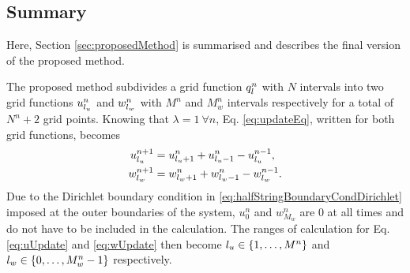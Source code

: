
% 

\subsection{Summary}
Here, Section \ref{sec:proposedMethod} is summarised and describes the final version of the proposed method.

The proposed method subdivides a grid function $q_l^n$ with $N$ intervals into two grid functions $u_{l_u}^n$ and $w_{l_w}^n$ with $M^n$ and $M_w^n$ intervals respectively for a total of $N^n+2$ grid points. Knowing that $\lambda=1 \ \forall n$, Eq. \eqref{eq:updateEq}, written for both grid functions, becomes 
\begin{subequations}\label{eq:uwUpdates}
    \begin{align}
        u_{l_u}^{n+1} &= u_{{l_u}+1}^n + u_{{l_u}-1}^n - u_{l_u}^{n-1},\label{eq:uUpdate}\\
        w_{l_w}^{n+1} &= w_{{l_w}+1}^n + w_{{l_w}-1}^n - w_{l_w}^{n-1}\label{eq:wUpdate}.
    \end{align}
\end{subequations}
%
Due to the Dirichlet boundary condition in \eqref{eq:halfStringBoundaryCondDirichlet} imposed at the outer boundaries of the system, $u_0^n$ and $w_{M_w}^n$ are $0$ at all times and do not have to be included in the calculation. The ranges of calculation for Eq. \eqref{eq:uUpdate} and \eqref{eq:wUpdate} then become ${l_u} \in \{1, \hdots, M^n\}$ and ${l_w} \in \{0, \hdots, M_w^n - 1\}$ respectively. 

